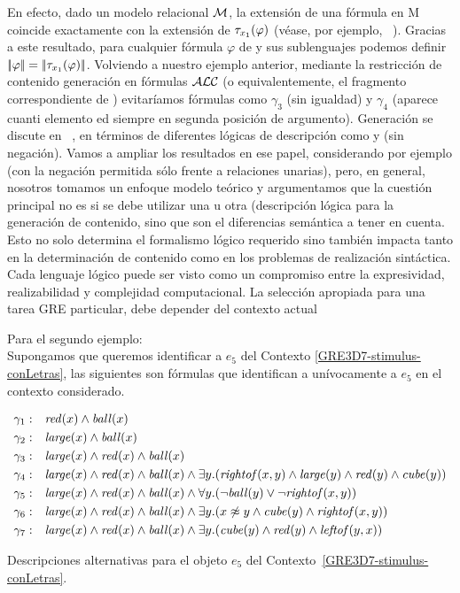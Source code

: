 En efecto, dado un modelo relacional $\mathcal{M}$, la extensi\'on de una f\'ormula \ALC en M coincide exactamente con la extensi\'on de $\mathit{\tau}_{x_1}(\varphi)$ (v\'ease, por ejemplo, ~\cite{baad:desc03}). Gracias
a este resultado, para cualquier f\'ormula $\varphi$ de \ALC y sus sublenguajes podemos definir $|\!|\varphi|\!| = |\!|\mathit{\tau}_{x_1}(\varphi)|\!|$.
 Volviendo a nuestro ejemplo anterior, mediante la restricci\'on de contenido
generaci\'on en f\'ormulas $\mathcal{ALC}$ (o equivalentemente, el fragmento correspondiente de \FOL)
evitar\'iamos f\'ormulas como
$\gamma_3$ (sin igualdad) y
$\gamma_4$ (aparece cuanti elemento ed
siempre en segunda posici\'on de argumento).
Generaci\'on se discute en ~\cite{AKS08}, en t\'erminos de diferentes l\'ogicas de descripci\'on como \ALC
y \EL (\ALC sin negaci\'on). Vamos a ampliar los resultados en ese papel, considerando por ejemplo \ELAN (\ALC con la negaci\'on permitida s\'olo frente a relaciones unarias), pero, en general, nosotros tomamos un enfoque modelo te\'orico y argumentamos que la cuesti\'on principal no es si se debe utilizar una u otra (descripci\'on l\'ogica para la generaci\'on de contenido, sino que son el diferencias sem\'antica a tener en cuenta. Esto no solo determina el formalismo l\'ogico requerido sino tambi\'en impacta tanto en la determinaci\'on de contenido como en los problemas de realizaci\'on sint\'actica. Cada
lenguaje l\'ogico puede ser visto como un compromiso entre la expresividad, realizabilidad y complejidad computacional. La selecci\'on apropiada para una tarea GRE particular, debe depender del contexto actual




Para el segundo ejemplo: \\
Supongamos que queremos identificar a $e_5$ del Contexto \ref{GRE3D7-stimulus-conLetras}, las siguientes son f\'ormulas que identifican a un\'ivocamente a $e_5$ en el contexto considerado.

\begin{table}
$$
\begin{array}{cl}
 \gamma_1: & \mathit{red}(x) \land \mathit{ball}(x)\\[3pt]
 \gamma_2: & \mathit{large}(x) \land \mathit{ball}(x)\\[3pt]
 \gamma_3: & \mathit{large}(x) \land \mathit{red}(x) \land \mathit{ball}(x)\\[3pt]
 \gamma_4: & \mathit{large}(x) \land \mathit{red}(x) \land \mathit{ball}(x) \land
   \exists y . (\mathit{rightof}(x,y) \land \mathit{large}(y) \land \mathit{red}(y) \land \mathit{cube}(y))\\[3pt]
 \gamma_5: & \mathit{large}(x) \land \mathit{red}(x) \land \mathit{ball}(x) \land
  \forall y . (\neg \mathit{ball}(y) \lor \neg \mathit{rightof}(x,y))\\[3pt]
 \gamma_6: & \mathit{large}(x) \land \mathit{red}(x) \land \mathit{ball}(x) \land
  \exists y . (x \not\approx y \land \mathit{cube}(y) \land \mathit{rightof}(x,y))\\[3pt]
 \gamma_7: & \mathit{large}(x) \land \mathit{red}(x) \land \mathit{ball}(x) \land
  \exists y . (\mathit{cube}(y) \land \mathit{red}(y) \land \mathit{leftof}(y,x))
 \end{array}
$$
\caption{Descripciones alternativas para el objeto $e_5$ del Contexto~\ref{GRE3D7-stimulus-conLetras}.}\label{tab:gammas}
\end{table}

